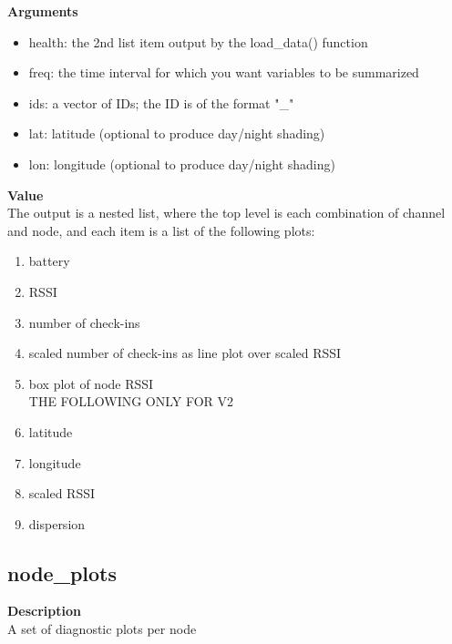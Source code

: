 \documentclass[
]{book}
\providecommand{\tightlist}{%
  \setlength{\itemsep}{0pt}\setlength{\parskip}{0pt}}
\begin{document}
\textbf{Arguments}

\begin{itemize}
\tightlist
\item
  health: the 2nd list item output by the load\_data() function\\
\item
  freq: the time interval for which you want variables to be summarized\\
\item
  ids: a vector of IDs; the ID is of the format "\_"\\
\item
  lat: latitude (optional to produce day/night shading)
\item
  lon: longitude (optional to produce day/night shading)
\end{itemize}

\textbf{Value}\\
The output is a nested list, where the top level is each combination of channel and node, and each item is a list of the following plots:

\begin{enumerate}
\def\labelenumi{\arabic{enumi}.}
\tightlist
\item
  battery\\
\item
  RSSI\\
\item
  number of check-ins\\
\item
  scaled number of check-ins as line plot over scaled RSSI\\
\item
  box plot of node RSSI\\
  THE FOLLOWING ONLY FOR V2\\
\item
  latitude\\
\item
  longitude\\
\item
  scaled RSSI\\
\item
  dispersion
\end{enumerate}

\hypertarget{node_plots}{%
\subsection{node\_plots}\label{node_plots}}

\textbf{Description}\\
A set of diagnostic plots per node
\end{document}
